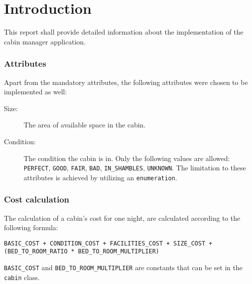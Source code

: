 \chapter{Introduction}\label{ch:introduction}

This report shall provide detailed information about the implementation of the cabin manager application.

\subsection{Attributes}
\label{subsec:attributes}

Apart from the mandatory attributes, the following attributes were chosen to be implemented as well:
\begin{description}
\item[Size:] The area of available space in the cabin.
\item[Condition:] The condition the cabin is in. Only the following values are allowed: \texttt{PERFECT}, \texttt{GOOD}, \texttt{FAIR}, \texttt{BAD}, \texttt{IN\_SHAMBLES}, \texttt{UNKNOWN}. The limitation to these attributes is achieved by utilizing an \texttt{enumeration}.
\end{description}

\subsection{Cost calculation}
\label{subsec:cost_calculation}

The calculation of a cabin's cost for one night, are calculated according to the following formula:

\texttt{BASIC\_COST + CONDITION\_COST + FACILITIES\_COST + SIZE\_COST + (BED\_TO\_ROOM\_RATIO * BED\_TO\_ROOM\_MULTIPLIER)}

\texttt{BASIC\_COST} and \texttt{BED\_TO\_ROOM\_MULTIPLIER} are constants that can be set in the \texttt{cabin} class.